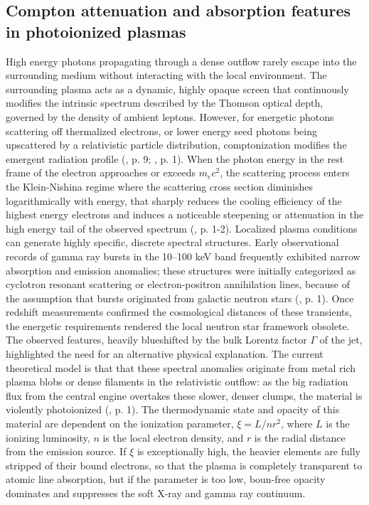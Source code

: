 \documentclass{aa} %
\begin{document}
\subsection{Compton attenuation and absorption features in photoionized plasmas} 
High energy photons propagating through a dense outflow rarely escape into the surrounding medium without interacting with the local environment. The surrounding plasma acts as a dynamic, highly opaque screen that continuously modifies the intrinsic spectrum described by the Thomson optical depth, governed by the density of ambient leptons. However, for energetic photons scattering off thermalized electrons, or lower energy seed photons being upscattered by a relativistic particle distribution, comptonization modifies the emergent radiation profile (\citet{Peer2019}, p. 9; \citet{Boettcheretal1996}, p. 1). When the photon energy in the rest frame of the electron approaches or exceeds $m_e c^2$, the scattering process enters the Klein-Nishina regime where the scattering cross section diminishes logarithmically with energy, that sharply reduces the cooling efficiency of the highest energy electrons and induces a noticeable steepening or attenuation in the high energy tail of the observed spectrum (\citet{Boettcheretal1996}, p. 1-2).
Localized plasma conditions can generate highly specific, discrete spectral structures. Early observational records of gamma ray bursts in the 10–100 keV band frequently exhibited narrow absorption and emission anomalies; these structures were initially categorized as cyclotron resonant scattering or electron-positron annihilation lines, because of the assumption that bursts originated from galactic neutron stars (\citet{Haileyetal1999}, p. 1). Once redshift measurements confirmed the cosmological distances of these transients, the energetic requirements rendered the local neutron star framework obsolete. The observed features, heavily blueshifted by the bulk Lorentz factor $\Gamma$ of the jet, highlighted the need for an alternative physical explanation.
The current theoretical model is that that these spectral anomalies originate from metal rich plasma blobs or dense filaments in the relativistic outflow: as the big radiation flux from the central engine overtakes these slower, denser clumps, the material is violently photoionized (\citet{Haileyetal1999}, p. 1). The thermodynamic state and opacity of this material are dependent on the ionization parameter, $\xi = L / n r^2$, where $L$ is the ionizing luminosity, $n$ is the local electron density, and $r$ is the radial distance from the emission source. If $\xi$ is exceptionally high, the heavier elements are fully stripped of their bound electrons, so that the plasma is completely transparent to atomic line absorption, but if the parameter is too low, boun-free opacity dominates and suppresses the soft X-ray and gamma ray continuum.
\end{document}
